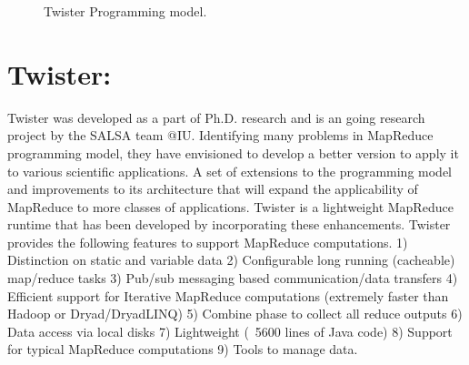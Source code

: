 \documentclass[9pt,twocolumn,twoside]{styles/osajnl}
\begin{document}
\begin{figure}[htbp]
\centering
{}
\caption{Twister Programming model.}
\label{fig:Twister Programming model}
\end{figure}


\section{Twister:}

Twister was developed as a part of Ph.D. research and is an going
research project by the SALSA team
@IU\cite{grolinger2014challenges}\cite{dean2008mapreduce}. Identifying
many problems in MapReduce programming model, they have envisioned to
develop a better version to apply it to various scientific
applications\cite{zaharia2010spark}. A set of extensions to the
programming model and improvements to its architecture that will
expand the applicability of MapReduce to more classes of
applications\cite{elsayed2014mapreduce}. Twister is a lightweight
MapReduce runtime that has been developed by incorporating these
enhancements\cite{ekanayake2010twister}\cite{lee2012parallel}. Twister
provides the following features to support MapReduce computations. 1)
Distinction on static and variable data 2) Configurable long running
(cacheable) map/reduce tasks 3) Pub/sub messaging based
communication/data transfers 4) Efficient support for Iterative
MapReduce computations (extremely faster than Hadoop or
Dryad/DryadLINQ) 5) Combine phase to collect all reduce outputs 6)
Data access via local disks 7) Lightweight (~5600 lines of Java code)
8) Support for typical MapReduce computations 9) Tools to manage
data\cite{twister}\cite{doulkeridis2014survey}.
\end{document}
